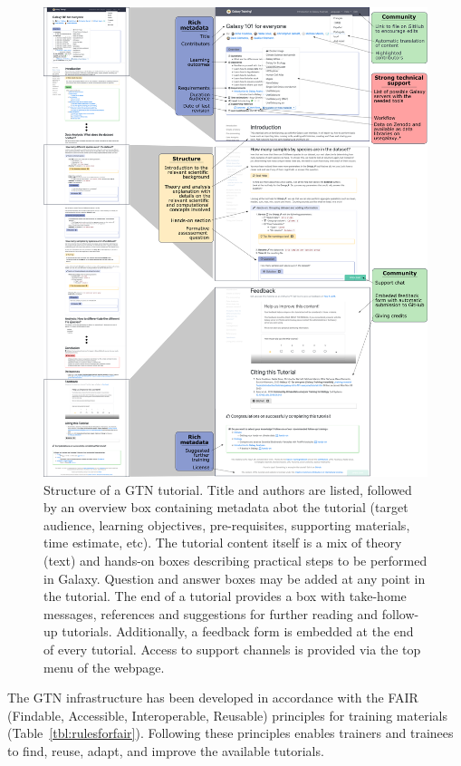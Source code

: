 \documentclass[10pt,letterpaper]{article}
\begin{document}
\begin{figure}[!ht]
	\centering
	\includegraphics[width=\textwidth]{images/tutorial_skeleton.png}
	\caption{Structure of a GTN tutorial. Title and authors are listed, followed by an overview box containing metadata abot the tutorial (target audience, learning objectives, pre-requisites, supporting materials, time estimate, etc). The tutorial content itself is a mix of theory (text) and hands-on boxes describing practical steps to be performed in Galaxy. Question and answer boxes may be added at any point in the tutorial. The end of a tutorial provides a box with take-home messages, references and suggestions for further reading and follow-up tutorials. Additionally, a feedback form is embedded at the end of every tutorial. Access to support channels is provided via the top menu of the webpage. 
	\label{fig:tutorial-skeleton}}
\end{figure}

The GTN infrastructure has been developed in accordance with the FAIR (Findable, Accessible, Interoperable, Reusable) principles for training materials \cite{Garcia2020} (Table~\ref{tbl:rulesforfair}). Following these principles enables trainers and trainees to find, reuse, adapt, and improve the available tutorials. 
\end{document}
